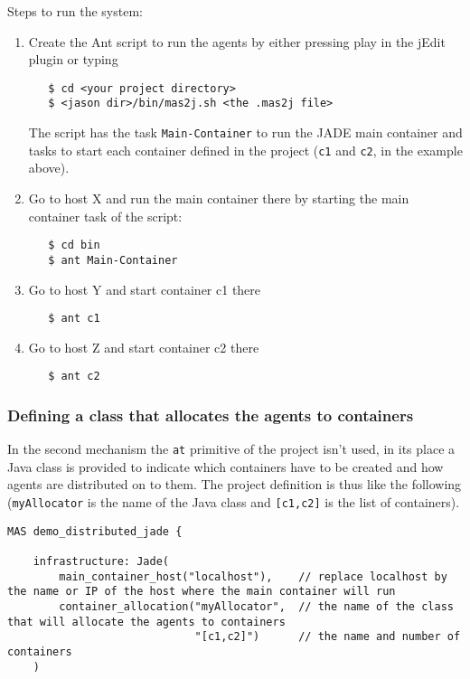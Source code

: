 \documentclass{article}
\begin{document}
\begin{description}
Steps to run the system:
\begin{enumerate}
\item Create the Ant script to run the agents by either pressing play in
  the jEdit plugin or typing
\begin{verbatim}
   $ cd <your project directory>
   $ <jason dir>/bin/mas2j.sh <the .mas2j file>
\end{verbatim}

  The script has the task \texttt{Main-Container} to run the JADE main
  container and tasks to start each container defined in the
  project (\texttt{c1} and \texttt{c2}, in the example above).

\item Go to host X and run the main container there by starting the
  main container task of the script:
\begin{verbatim}
   $ cd bin
   $ ant Main-Container
\end{verbatim}

\item Go to host Y and start container c1 there
\begin{verbatim}
   $ ant c1
\end{verbatim}

\item Go to host Z and start container c2 there
\begin{verbatim}
   $ ant c2
\end{verbatim}
\end{enumerate}


\subsubsection{Defining a class that allocates the agents to containers}

In the second mechanism the \texttt{at} primitive of the project isn't
used, in its place a Java class is provided to indicate which
containers have to be created and how agents are distributed on to them.
The project definition is thus like the following
(\texttt{myAllocator} is the name of the Java class and
\texttt{[c1,c2]} is the list of containers).
\begin{verbatim}
MAS demo_distributed_jade {

    infrastructure: Jade(
        main_container_host("localhost"),    // replace localhost by the name or IP of the host where the main container will run
        container_allocation("myAllocator",  // the name of the class that will allocate the agents to containers
                             "[c1,c2]")      // the name and number of containers
    ) 
	


\end{verbatim}
\end{description}
\end{document}
